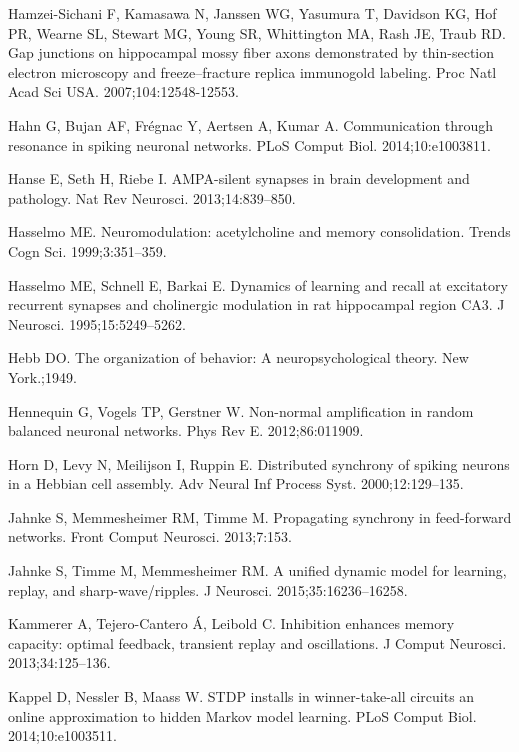\begin{thebibliography}{}
Hamzei-Sichani F, Kamasawa N, Janssen WG, Yasumura T, Davidson KG, Hof PR, Wearne SL, Stewart MG, Young SR, Whittington MA, Rash JE, Traub RD.
\newblock Gap junctions on hippocampal mossy fiber axons demonstrated by thin-section electron microscopy and freeze--fracture replica immunogold labeling.
\newblock Proc Natl Acad Sci USA. 2007;104:12548-12553.

Hahn G, Bujan AF, Fr\'egnac Y, Aertsen A, Kumar A.
\newblock Communication through resonance in spiking neuronal networks.
\newblock PLoS Comput Biol. 2014;10:e1003811.

Hanse E, Seth H, Riebe I.
\newblock AMPA-silent synapses in brain development and pathology.
\newblock Nat Rev Neurosci. 2013;14:839--850.

Hasselmo ME.
\newblock Neuromodulation: acetylcholine and memory consolidation.
\newblock Trends Cogn Sci. 1999;3:351--359.

Hasselmo ME, Schnell E, Barkai E.
\newblock Dynamics of learning and recall at excitatory recurrent synapses and
  cholinergic modulation in rat hippocampal region CA3.
\newblock J Neurosci. 1995;15:5249--5262.

Hebb DO.
\newblock The organization of behavior: A neuropsychological theory.
\newblock New York.;1949.

Hennequin G, Vogels TP, Gerstner W.
\newblock Non-normal amplification in random balanced neuronal networks.
\newblock Phys Rev E. 2012;86:011909.

Horn D, Levy N, Meilijson I, Ruppin E.
\newblock Distributed synchrony of spiking neurons in a Hebbian cell assembly.
\newblock Adv Neural Inf Process Syst. 2000;12:129--135.

Jahnke S, Memmesheimer RM, Timme M.
\newblock Propagating synchrony in feed-forward networks.
\newblock Front Comput Neurosci. 2013;7:153.

Jahnke S, Timme M, Memmesheimer RM.
\newblock A unified dynamic model for learning, replay, and sharp-wave/ripples.
\newblock J Neurosci. 2015;35:16236--16258.

Kammerer A, Tejero-Cantero {\'A}, Leibold C.
\newblock Inhibition enhances memory capacity: optimal feedback, transient
  replay and oscillations.
\newblock J Comput Neurosci. 2013;34:125--136.

Kappel D, Nessler B, Maass W.
\newblock STDP installs in winner-take-all circuits an online approximation to hidden Markov model learning.
\newblock PLoS Comput Biol. 2014;10:e1003511.


\end{thebibliography}
